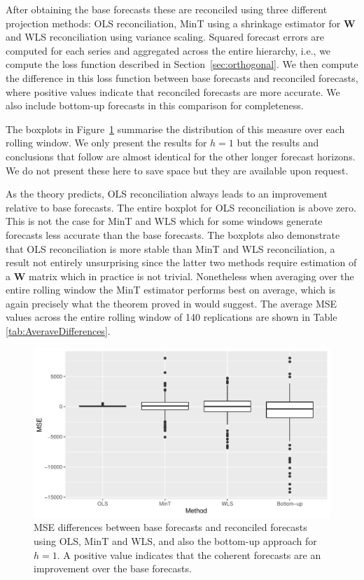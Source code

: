 \documentclass[12pt]{article}
\theoremstyle{definition}
\begin{document}
    After obtaining the base forecasts these are reconciled using three different projection methods: OLS reconciliation, MinT using a shrinkage estimator for ${\bm W}$ and WLS reconciliation using variance scaling. Squared forecast errors are computed for each series and aggregated across the entire hierarchy, i.e., we compute the loss function described in Section~\ref{sec:orthogonal}.  We then compute the difference in this loss function between base forecasts and reconciled forecasts, where positive values indicate that reconciled forecasts are more accurate. We also include bottom-up forecasts in this comparison for completeness.

    The boxplots in Figure~\ref{fig:BaseVSRecon_Fc} summarise the distribution of this measure over each rolling window. We only present the results for $h=1$ but the results and conclusions that follow are almost identical for the other longer forecast horizons. We do not present these here to save space but they are available upon request.

    As the theory predicts, OLS reconciliation always leads to an improvement relative to base forecasts. The entire boxplot for OLS reconciliation is above zero.  This is not the case for MinT and WLS which for some windows generate forecasts less accurate than the base forecasts. The boxplots also demonstrate that OLS reconciliation is more stable than MinT and WLS reconciliation, a result not entirely unsurprising since the latter two methods require estimation of a ${\bm W}$ matrix which in practice is not trivial.  Nonetheless when averaging over the entire rolling window the MinT estimator performs best on average, which is again precisely what the theorem proved in \cite{WicEtAl2019} would suggest. The average MSE values across the entire rolling window of 140 replications are shown in Table \ref{tab:AveraveDifferences}.

\begin{figure}[H]
    	\centering
    	\small
    	\includegraphics[width = \textwidth]{Figs/BoxPlot.pdf}
    	\caption{MSE differences between base forecasts and reconciled forecasts using OLS, MinT and WLS, and also the bottom-up approach for $h = 1$. A positive value indicates that the coherent forecasts are an improvement over the base forecasts.} \label{fig:BaseVSRecon_Fc}
\end{figure}
\end{document}

